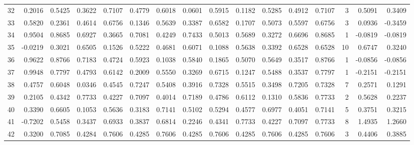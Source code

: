 \begin{tabular}{lrrrrrrrrrrrrrrr}
32  &      0.2016 &  0.5425 &  0.3622 &  0.7107 &  0.4779 &  0.6018 &  0.0601 &  0.5915 &  0.1182 &  0.5285 &   0.4912 &     0.7107 &      3 &                    0.5091 &                     0.3409 \\
33  &      0.5820 &  0.2361 &  0.4614 &  0.6756 &  0.1346 &  0.5639 &  0.3387 &  0.6582 &  0.1707 &  0.5073 &   0.5597 &     0.6756 &      3 &                    0.0936 &                    -0.3459 \\
34  &      0.9504 &  0.8685 &  0.6927 &  0.3665 &  0.7081 &  0.4249 &  0.7433 &  0.5013 &  0.5689 &  0.3272 &   0.6696 &     0.8685 &      1 &                   -0.0819 &                    -0.0819 \\
35  &     -0.0219 &  0.3021 &  0.6505 &  0.1526 &  0.5222 &  0.4681 &  0.6071 &  0.1088 &  0.5638 &  0.3392 &   0.6528 &     0.6528 &     10 &                    0.6747 &                     0.3240 \\
36  &      0.9622 &  0.8766 &  0.7183 &  0.4724 &  0.5923 &  0.1038 &  0.5840 &  0.1865 &  0.5070 &  0.5649 &   0.3517 &     0.8766 &      1 &                   -0.0856 &                    -0.0856 \\
37  &      0.9948 &  0.7797 &  0.4793 &  0.6142 &  0.2009 &  0.5550 &  0.3269 &  0.6715 &  0.1247 &  0.5488 &   0.3537 &     0.7797 &      1 &                   -0.2151 &                    -0.2151 \\
38  &      0.4757 &  0.6048 &  0.0346 &  0.4545 &  0.7247 &  0.5408 &  0.3916 &  0.7328 &  0.5515 &  0.3498 &   0.7205 &     0.7328 &      7 &                    0.2571 &                     0.1291 \\
39  &      0.2105 &  0.4342 &  0.7733 &  0.4227 &  0.7097 &  0.4014 &  0.7189 &  0.4786 &  0.6112 &  0.1310 &   0.5836 &     0.7733 &      2 &                    0.5628 &                     0.2237 \\
40  &      0.3390 &  0.6605 &  0.1053 &  0.5636 &  0.3183 &  0.7141 &  0.5102 &  0.5294 &  0.4577 &  0.6977 &   0.4051 &     0.7141 &      5 &                    0.3751 &                     0.3215 \\
41  &     -0.7202 &  0.5458 &  0.3437 &  0.6933 &  0.3837 &  0.6814 &  0.2246 &  0.4341 &  0.7733 &  0.4227 &   0.7097 &     0.7733 &      8 &                    1.4935 &                     1.2660 \\
42  &      0.3200 &  0.7085 &  0.4284 &  0.7606 &  0.4285 &  0.7606 &  0.4285 &  0.7606 &  0.4285 &  0.7606 &   0.4285 &     0.7606 &      3 &                    0.4406 &                     0.3885 \\

\end{tabular}
